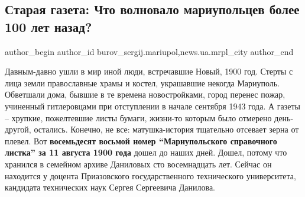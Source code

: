  
 
 
 
 
 
\subsection{Старая газета: Что волновало мариупольцев более 100 лет назад?}
\label{sec:17_11_2018.stz.news.ua.mrpl_city.1.staraja_gazeta_chto_volnovalo_100_let_nazad}
 
\ifcmt
 author_begin
   author_id burov_sergij.mariupol,news.ua.mrpl_city
 author_end
\fi


Давным-давно ушли в мир иной люди, встречавшие Новый, 1900 год. Стерты с лица
земли православные храмы и костел, украшавшие некогда Мариуполь. Обветшали
дома, бывшие в те времена новостройками, город перенес пожар, учиненный
гитлеровцами при отступлении в начале сентября 1943 года. А газеты – хрупкие,
пожелтевшие листы бумаги, жизни-то которым было отмерено день-другой, остались.
Конечно, не все: матушка-история тщательно отсевает зерна от плевел. Вот
\textbf{восемьдесят восьмой номер \enquote{Мариупольского справочного листка} за 11 августа
1900 года} дошел до наших дней. Дошел, потому что хранился в семейном архиве
Даниловых сто восемнадцать лет. Сейчас он находится у доцента Приазовского
государственного технического университета, кандидата технических наук Сергея
Сергеевича Данилова.

